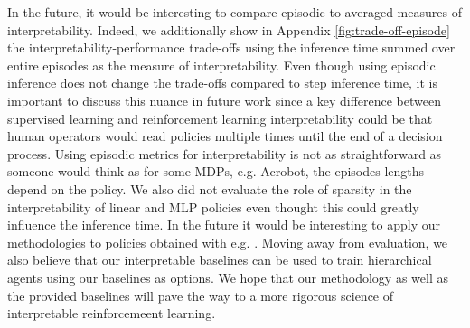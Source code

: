 In the future, it would be interesting to compare episodic to averaged measures of interpretability. Indeed, we additionally show in Appendix \ref{fig:trade-off-episode} the interpretability-performance trade-offs using the inference time summed over entire episodes as the measure of interpretability. Even though using episodic inference does not change the trade-offs compared to step inference time, it is important to discuss this nuance in future work since a key difference between supervised learning and reinforcement learning interpretability could be that human operators would read policies multiple times until the end of a decision process. Using episodic metrics for interpretability is not as straightforward as someone would think as for some MDPs, e.g. Acrobot, the episodes lengths depend on the policy. We also did not evaluate the role of sparsity in the interpretability of linear and MLP policies even thought this could greatly influence the inference time. In the future it would be interesting to apply our methodologies to policies obtained with e.g. \cite{sparsity}. Moving away from evaluation, we also believe that our interpretable baselines can be used to train hierarchical agents \cite{hierarchical} using our baselines as options. We hope that our methodology as well as the provided baselines will pave the way to a more rigorous science of interpretable reinforcemeent learning.
